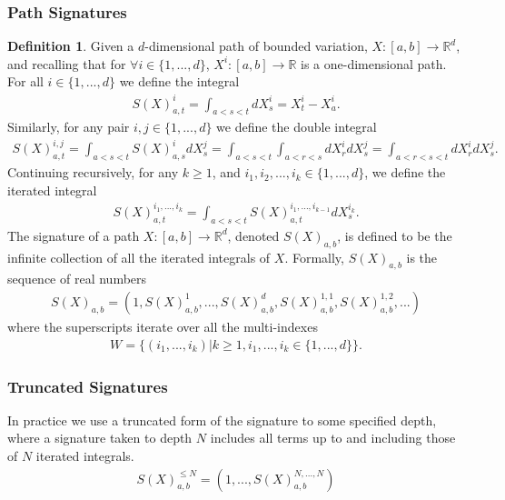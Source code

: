 \documentclass{article}
\theoremstyle{definition}
\newtheorem{definition}{Definition}[section]
\begin{document}
\subsubsection{Path Signatures}
\begin{definition}
Given a $d$-dimensional path of bounded variation, $X:[a,b] \rightarrow \mathbb{R}^{d}$, and recalling that for $\forall i \in \{1,...,d\}$, $ X^i:[a,b] \rightarrow \mathbb{R}$ is a one-dimensional path. For all $i \in \{1,...,d\}$ we define the integral
\begin{align}
    S(X)_{a,t}^{i} = \int_{a<s<t} d X_{s}^{i} = X_{t}^{i} - X_{a}^{i}.
\end{align}
Similarly, for any pair $i,j \in \{1,...,d\}$ we define the double integral
\begin{align}
    S(X)_{a,t}^{i,j} = \int_{a<s<t} S(X)_{a,s}^{i} d X_{s}^{j} = \int_{a<s<t} \int_{a<r<s} d X_{r}^{i} 
 d X_{s}^{j} = \int_{a<r<s<t} d X_{r}^{i} d X_{s}^{j}.
\end{align}
 Continuing recursively, for any $k\geq 1$, and $i_{1}, i_{2}, ..., i_{k} \in \{1,...,d\}$, we define the iterated integral
 \begin{align}
   S(X)_{a,t}^{i_{1},...,i_{k}} = \int_{a<s<t} S(X)_{a,t}^{i_{1},...,i_{k-1}} d X_{s}^{i_{k}}.  
 \end{align}
 The signature of a path $X:[a,b] \rightarrow \mathbb{R}^{d}$, denoted $S(X)_{a,b}$, is defined to be the infinite collection of all the iterated integrals of $X$. Formally, $S(X)_{a,b}$ is the sequence of real numbers
 \begin{align}
 S(X)_{a,b} = \left(1, S(X)_{a,b}^{1}, ..., S(X)_{a,b}^{d}, S(X)_{a,b}^{1,1}, S(X)_{a,b}^{1,2}, ...  \right)
 \end{align}
 where the superscripts iterate over all the multi-indexes 
 \begin{align}
 W = \{(i_{1},...,i_{k})|k\geq1,i_{1},...,i_{k} \in \{1,...,d\}\}.
 \end{align}
 \subsubsection{Truncated Signatures}
 In practice we use a truncated form of the signature to some specified depth, where a signature taken to depth $N$ includes all terms up to and including those of $N$ iterated integrals.
 \begin{align}
     S(X)_{a,b}^{\leq N} = \left(1,...,S(X)_{a,b}^{N,...,N}\right)
 \end{align}
\end{definition}
\end{document}
